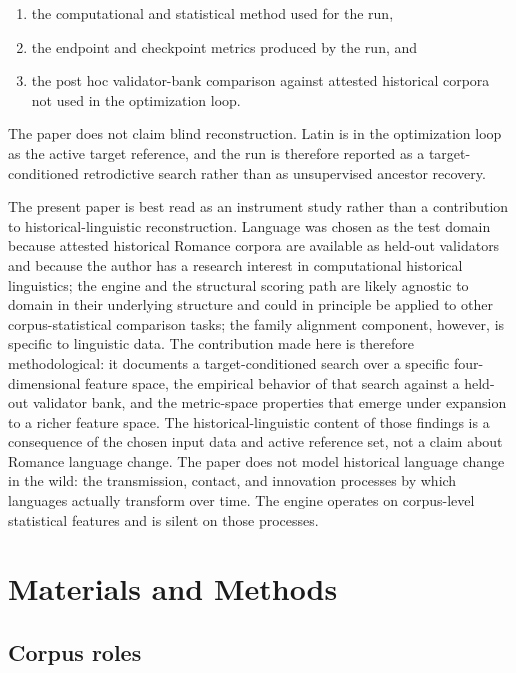 \documentclass[11pt]{article}
\begin{document}
\begin{enumerate}
    \item the computational and statistical method used for the run,
    \item the endpoint and checkpoint metrics produced by the run, and
    \item the post hoc validator-bank comparison against attested historical
    corpora not used in the optimization loop.
\end{enumerate}

The paper does not claim blind reconstruction. Latin is in the optimization
loop as the active target reference, and the run is therefore reported as a
target-conditioned retrodictive search rather than as unsupervised ancestor
recovery.

The present paper is best read as an instrument study rather than a
contribution to historical-linguistic reconstruction. Language was chosen
as the test domain because attested historical Romance corpora are available
as held-out validators and because the author has a research interest in
computational historical linguistics; the engine and the structural scoring path are
likely agnostic to domain in their underlying structure and could in principle be
applied to other corpus-statistical comparison tasks; the family alignment
component, however, is specific to linguistic data. The contribution made
here is therefore methodological: it documents a target-conditioned search
over a specific four-dimensional feature space, the empirical behavior of
that search against a held-out validator bank, and the metric-space
properties that emerge under expansion to a richer feature space. The
historical-linguistic content of those findings is a consequence of the
chosen input data and active reference set, not a claim about Romance
language change. The paper does not model historical language change in
the wild: the transmission, contact, and innovation processes by which
languages actually transform over time. The engine operates on corpus-level
statistical features and is silent on those processes.

\section{Materials and Methods}

\subsection{Corpus roles}
\end{document}
